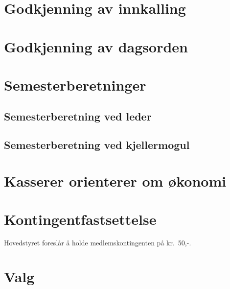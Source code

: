 \documentclass[10pt,norsk,a4paper,usenames,dvipsnames]{article}
\begin{document}
\section{Godkjenning av innkalling}


\section{Godkjenning av dagsorden}

\section{Semesterberetninger}
    \subsection{Semesterberetning ved leder}
    \subsection{Semesterberetning ved kjellermogul}
    
    
\section{Kasserer orienterer om økonomi}


\section{Kontingentfastsettelse}
    Hovedstyret foreslår å holde medlemskontingenten på kr.~50,-.


\section{Valg}
\end{document}
